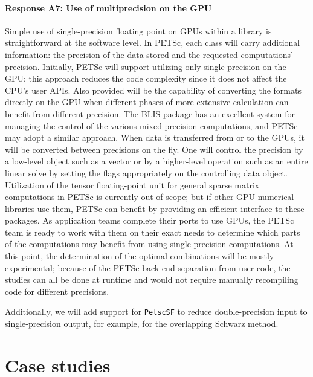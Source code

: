 \documentclass[5p,times]{elsarticle}
\begin{document}
\paragraph{Response A7: Use of multiprecision on the GPU}
Simple use of single-precision floating point on GPUs within a library is
straightforward at the software level. In PETSc, each class will carry additional information: the precision of the data stored and the requested computations' precision. Initially, PETSc will support utilizing only single-precision on the GPU; this approach reduces the code complexity since it does not affect
the CPU's user APIs. Also provided will be the capability of converting the
formats directly on the GPU when different phases of more extensive calculation can
benefit from different precision. The BLIS \cite{BLIS7} package has an excellent
system for managing the control of the various mixed-precision computations, and
PETSc may adopt a similar approach. When data is transferred from or to the
GPUs, it will be converted between precisions on the fly. One will control the precision by a low-level object such
as a vector or by a higher-level operation such as an entire linear solve by
setting the flags appropriately on the controlling data object. Utilization of
the tensor floating-point unit for general sparse matrix computations in PETSc is
currently out of scope; but if other GPU numerical libraries use them, PETSc
can benefit by providing an efficient interface to these packages.    As application teams complete their
ports to use GPUs, the PETSc team is ready to work with them on their exact
needs to determine which parts of the computations may benefit from using
single-precision computations. At this point, the determination of the optimal
combinations will be mostly experimental; because of the PETSc back-end
separation from user code, the studies can all be done at runtime and would not
require manually recompiling code for different precisions. 

Additionally, we will add support for {\tt PetscSF} to reduce double-precision input to single-precision output, for example, for the
overlapping Schwarz method.




\section{Case studies}
\end{document}
